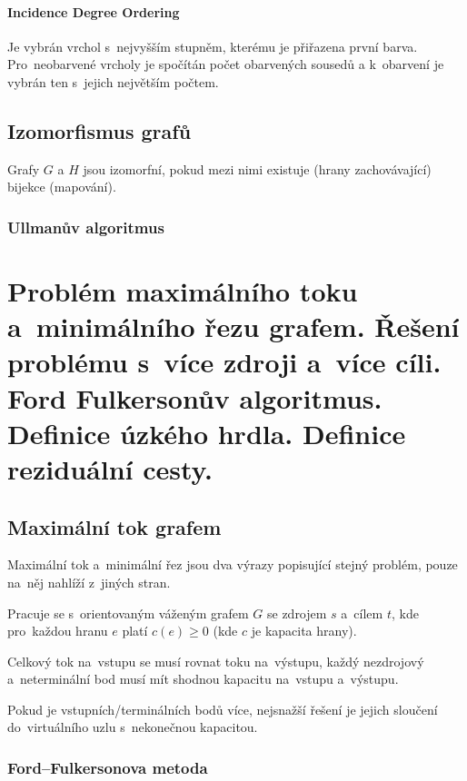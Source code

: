 \paragraph{Incidence Degree Ordering}

Je vybrán vrchol s~nejvyšším stupněm, kterému je přiřazena první barva.
Pro~neobarvené vrcholy je spočítán počet obarvených sousedů a k~obarvení je vybrán ten s~jejich největším počtem.

\subsection{Izomorfismus grafů}

Grafy $G$ a $H$ jsou izomorfní, pokud mezi nimi existuje (hrany zachovávající) bijekce (mapování).

\subsubsection{Ullmanův algoritmus}

\clearpage
\section{Problém maximálního toku a~minimálního řezu grafem. Řešení problému s~více zdroji a~více cíli. Ford Fulkersonův algoritmus. Definice úzkého hrdla. Definice reziduální cesty.}

\subsection{Maximální tok grafem}

Maximální tok a~minimální řez jsou dva výrazy popisující stejný problém, pouze na~něj nahlíží z~jiných stran.

Pracuje se s~orientovaným váženým grafem $G$ se zdrojem $s$ a~cílem $t$, kde pro~každou hranu $e$ platí $c(e) \geq 0$ (kde $c$ je kapacita hrany).

Celkový tok na~vstupu se musí rovnat toku na~výstupu, každý nezdrojový a~neterminální bod musí mít shodnou kapacitu na~vstupu a~výstupu.

Pokud je vstupních/terminálních bodů více, nejsnažší řešení je jejich sloučení do~virtuálního uzlu s~nekonečnou kapacitou.

\subsubsection{Ford--Fulkersonova metoda}

